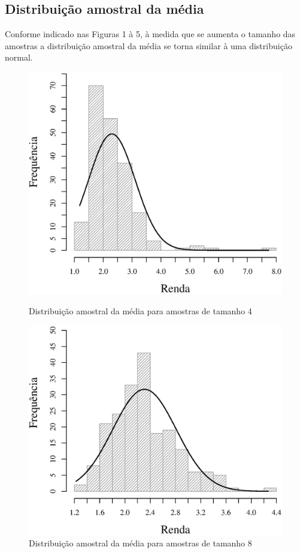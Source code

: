 \subsection{Distribuição amostral da média}
Conforme indicado nas Figuras 1 à 5, à medida que se aumenta o tamanho das amostras
a distribuição amostral da média se torna similar à uma distribuição normal.

\begin{figure}[h]
\begin{minipage}{0.50\textwidth}
	\includegraphics[width=\linewidth]{plots/histogram_renda_n4.eps}
	\caption{Distribuição amostral da média para amostras de tamanho 4}
	\label{fig:m4}
\end{minipage}
\begin{minipage}{0.50\textwidth}
	\includegraphics[width=\linewidth]{plots/histogram_renda_n8.eps}
	\caption{Distribuição amostral da média para amostras de tamanho 8}
	\label{fig:m8}
\end{minipage}
\end{figure}

